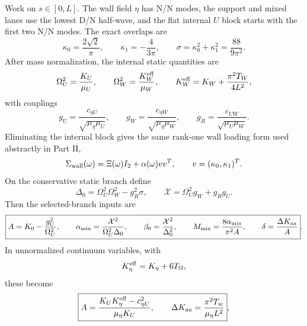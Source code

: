 Work on \(s\in[0,L]\).  The wall field \(\eta\) has N/N modes, the support and mixed lanes use the lowest D/N half-wave, and the flat internal \(U\) block starts with the first two N/N modes.  The exact overlaps are
\begin{equation}
\label{eq:part03-kappa-vector}
\kappa_0=\frac{2\sqrt2}{\pi},
\qquad
\kappa_1=-\frac{4}{3\pi},
\qquad
\sigma=\kappa_0^2+\kappa_1^2=\frac{88}{9\pi^2}.
\end{equation}
After mass normalization, the internal static quantities are
\begin{equation}
\label{eq:part03-mass-normalized-frequencies}
\Omega_U^2=\frac{K_U}{\mu_U},
\qquad
\Omega_W^2=\frac{K_W^{\rm eff}}{\mu_W},
\qquad
K_W^{\rm eff}=K_W+\frac{\pi^2T_W}{4L^2},
\end{equation}
with couplings
\begin{equation}
\label{eq:part03-mass-normalized-couplings}
 g_U=\frac{c_{\eta U}}{\sqrt{\mu_\eta\mu_U}},
\qquad
 g_W=\frac{c_{\eta W}}{\sqrt{\mu_\eta\mu_W}},
\qquad
 g_R=\frac{c_{UW}}{\sqrt{\mu_U\mu_W}}.
\end{equation}
Eliminating the internal block gives the same rank-one wall loading form used abstractly in Part II,
\begin{equation}
\label{eq:part03-stage20-schur}
\Sigma_{\rm wall}(\omega)=\Xi(\omega)I_2+\alpha(\omega)vv^T,
\qquad
v=(\kappa_0,\kappa_1)^T.
\end{equation}
On the conservative static branch define
\begin{equation}
\label{eq:part03-stage20-delta-chi}
\Delta_0=\Omega_U^2\Omega_W^2-g_R^2\sigma,
\qquad
\mathcal X=\Omega_U^2g_W+g_Rg_U.
\end{equation}
Then the selected-branch inputs are
\begin{equation}
\label{eq:part03-stage20-abstract-data}
\boxed{
A=K_0-\frac{g_U^2}{\Omega_U^2},
\qquad
\alpha_{\rm mix}=\frac{\mathcal X^2}{\Omega_U^2\Delta_0},
\qquad
\beta_0=\frac{\mathcal X^2}{\Delta_0^2},
\qquad
M_{\rm mix}=\frac{8\alpha_{\rm mix}}{\pi^2A},
\qquad
\delta=\frac{\Delta K_{\rm ax}}{A}}.
\end{equation}
In unnormalized continuum variables, with
\begin{equation}
K_\eta^{\rm eff}=K_\eta+6T_\Omega,
\end{equation}
these become
\begin{equation}
\label{eq:part03-stage20-A-continuum}
\boxed{
A=\frac{K_UK_\eta^{\rm eff}-c_{\eta U}^2}{\mu_\eta K_U},
\qquad
\Delta K_{\rm ax}=\frac{\pi^2T_w}{\mu_\eta L^2}},
\end{equation}

